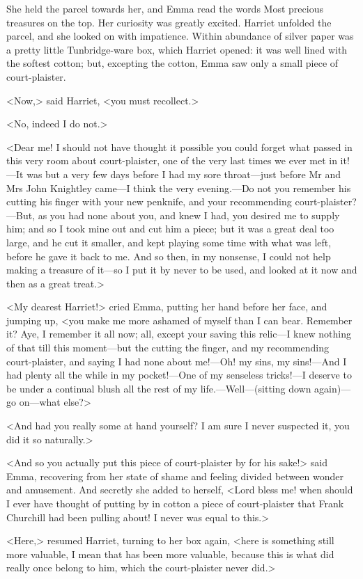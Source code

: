 She held the parcel towards her, and Emma read the words Most precious treasures on the top. Her curiosity was greatly excited. Harriet unfolded the parcel, and she looked on with impatience. Within abundance of silver paper was a pretty little Tunbridge-ware box, which Harriet opened: it was well lined with the softest cotton; but, excepting the cotton, Emma saw only a small piece of court-plaister.

<Now,> said Harriet, <you must recollect.>

<No, indeed I do not.>

<Dear me! I should not have thought it possible you could forget what passed in this very room about court-plaister, one of the very last times we ever met in it!—It was but a very few days before I had my sore throat—just before Mr and Mrs John Knightley came—I think the very evening.—Do not you remember his cutting his finger with your new penknife, and your recommending court-plaister?—But, as you had none about you, and knew I had, you desired me to supply him; and so I took mine out and cut him a piece; but it was a great deal too large, and he cut it smaller, and kept playing some time with what was left, before he gave it back to me. And so then, in my nonsense, I could not help making a treasure of it—so I put it by never to be used, and looked at it now and then as a great treat.>

<My dearest Harriet!> cried Emma, putting her hand before her face, and jumping up, <you make me more ashamed of myself than I can bear. Remember it? Aye, I remember it all now; all, except your saving this relic—I knew nothing of that till this moment—but the cutting the finger, and my recommending court-plaister, and saying I had none about me!—Oh! my sins, my sins!—And I had plenty all the while in my pocket!—One of my senseless tricks!—I deserve to be under a continual blush all the rest of my life.—Well—(sitting down again)—go on—what else?>

<And had you really some at hand yourself? I am sure I never suspected it, you did it so naturally.>

<And so you actually put this piece of court-plaister by for his sake!> said Emma, recovering from her state of shame and feeling divided between wonder and amusement. And secretly she added to herself, <Lord bless me! when should I ever have thought of putting by in cotton a piece of court-plaister that Frank Churchill had been pulling about! I never was equal to this.>

<Here,> resumed Harriet, turning to her box again, <here is something still more valuable, I mean that has been more valuable, because this is what did really once belong to him, which the court-plaister never did.>


